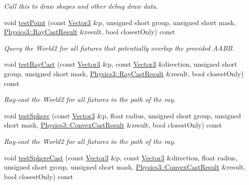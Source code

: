 \begin{DoxyCompactItemize}
\begin{DoxyCompactList}\small\item\em Call this to draw shapes and other debug draw data. \end{DoxyCompactList}\item 
void \hyperlink{class_i_dream_sky_1_1_physics3_1_1_world_a583c310dd3902faf7e275c0b789f18f4}{test\+Point} (const \hyperlink{class_i_dream_sky_1_1_vector3}{Vector3} \&p, unsigned short group, unsigned short mask, \hyperlink{class_i_dream_sky_1_1_physics3_1_1_ray_cast_result}{Physics3\+::\+Ray\+Cast\+Result} \&result, bool closest\+Only) const 
\begin{DoxyCompactList}\small\item\em Query the World2 for all fixtures that potentially overlap the provided A\+A\+BB. \end{DoxyCompactList}\item 
void \hyperlink{class_i_dream_sky_1_1_physics3_1_1_world_a8edc4321eb301a4c8b887b589cc08d7d}{test\+Ray\+Cast} (const \hyperlink{class_i_dream_sky_1_1_vector3}{Vector3} \&p, const \hyperlink{class_i_dream_sky_1_1_vector3}{Vector3} \&direction, unsigned short group, unsigned short mask, \hyperlink{class_i_dream_sky_1_1_physics3_1_1_ray_cast_result}{Physics3\+::\+Ray\+Cast\+Result} \&result, bool closest\+Only) const 
\begin{DoxyCompactList}\small\item\em Ray-\/cast the World2 for all fixtures in the path of the ray. \end{DoxyCompactList}\item 
void \hyperlink{class_i_dream_sky_1_1_physics3_1_1_world_a22e20c6445ccc46b475a8b8624900702}{test\+Sphere} (const \hyperlink{class_i_dream_sky_1_1_vector3}{Vector3} \&p, float radius, unsigned short group, unsigned short mask, \hyperlink{class_i_dream_sky_1_1_physics3_1_1_convex_cast_result}{Physics3\+::\+Convex\+Cast\+Result} \&result, bool closest\+Only) const 
\begin{DoxyCompactList}\small\item\em Ray-\/cast the World2 for all fixtures in the path of the ray. \end{DoxyCompactList}\item 
void \hyperlink{class_i_dream_sky_1_1_physics3_1_1_world_a53dfc1bd761e0787f22a111d82c800a2}{test\+Sphere\+Cast} (const \hyperlink{class_i_dream_sky_1_1_vector3}{Vector3} \&p, const \hyperlink{class_i_dream_sky_1_1_vector3}{Vector3} \&direction, float radius, unsigned short group, unsigned short mask, \hyperlink{class_i_dream_sky_1_1_physics3_1_1_convex_cast_result}{Physics3\+::\+Convex\+Cast\+Result} \&result, bool closest\+Only) const 

\end{DoxyCompactItemize}
